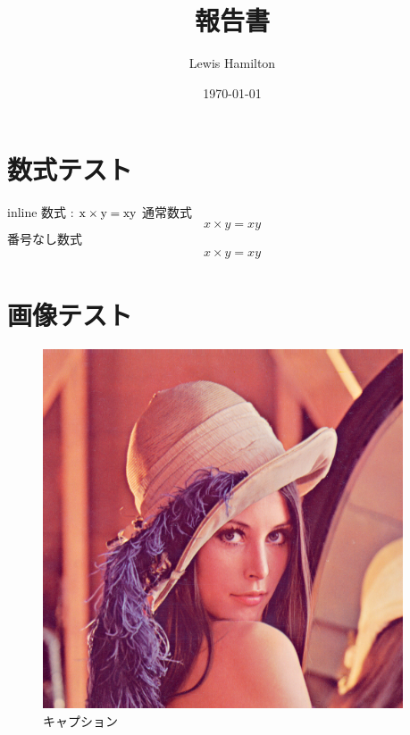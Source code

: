 \documentclass[uplatex, dvipdfmx]{jsarticle}
\title{\huge 報告書}
\author{Lewis Hamilton}
\date{\today}
\begin{document}
\maketitle
\thispagestyle{empty}
\newpage

\tableofcontents %
\newpage

\section{数式テスト}
inline 数式 : ${\rm x \times y = xy}$
通常数式
\begin{equation}
  x \times y = xy
\end{equation}
番号なし数式
\begin{eqnarray*}
  x \times y = xy
\end{eqnarray*}

\section{画像テスト}
\begin{figure}
  \centering
  \includegraphics[width=0.95\textwidth]{Lenna.png}
  \caption{キャプション}
  \label{figure_label}
\end{figure}



\end{document}
